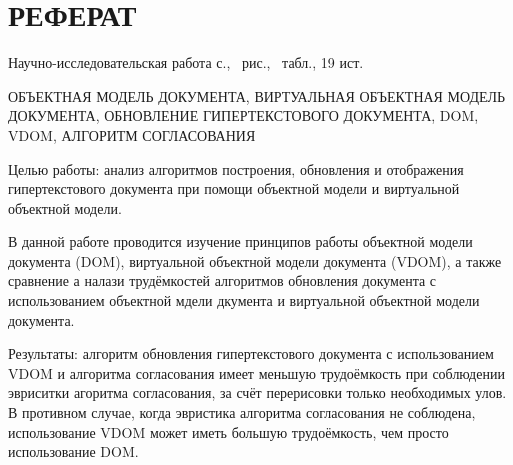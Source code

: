 \section*{РЕФЕРАТ}

Научно-исследовательская работа \pageref{LastPage} с., \totalfigures\ рис., \totaltables\ табл., 19 ист.

ОБЪЕКТНАЯ МОДЕЛЬ ДОКУМЕНТА, ВИРТУАЛЬНАЯ ОБЪЕКТНАЯ МОДЕЛЬ ДОКУМЕНТА, ОБНОВЛЕНИЕ ГИПЕРТЕКСТОВОГО ДОКУМЕНТА, DOM, VDOM, АЛГОРИТМ СОГЛАСОВАНИЯ

Целью работы: анализ алгоритмов построения, обновления и отображения гипертекстового документа при помощи объектной модели и виртуальной объектной модели.

В данной работе проводится изучение принципов работы объектной модели документа (DOM), виртуальной объектной модели документа (VDOM), а также сравнение а налази трудёмкостей алгоритмов обновления документа с использованием объектной мдели дкумента и виртуальной объектной модели документа.

Результаты: алгоритм обновления гипертекстового документа с использованием VDOM и алгоритма согласования имеет меньшую трудоёмкость при соблюдении эвриситки агоритма согласования, за счёт перерисовки только необходимых улов.
В противном случае, когда эвристика алгоритма согласования не соблюдена, использование VDOM может иметь большую трудоёмкость, чем просто использование DOM.


\pagebreak
